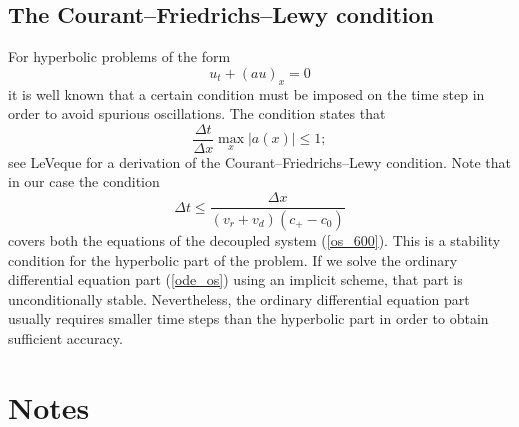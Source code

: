 \subsection{The Courant--Friedrichs--Lewy condition}
For hyperbolic problems of the form 
\begin{equation}
u_{t}+\left(  au\right)  _{x}=0
\end{equation}
it is well known that a certain condition must be imposed on the time step in order to avoid spurious oscillations. The condition states that 
\begin{equation}
\frac{\Delta t}{\Delta x} \max_x \vert a(x)\vert \le 1; \label{CFL}
\end{equation}
see LeVeque \cite{LeVeque2002} for a derivation of the Courant--Friedrichs--Lewy condition. Note that in our case the condition\begin{equation}
\Delta t\le \frac{\Delta x}{(v_r+v_d)(c_+ -c_0)} \label{CFL2}
\end{equation}
covers both the equations of the decoupled system (\ref{os_600}). This is a stability condition for the hyperbolic part of the problem. If we solve the ordinary differential equation part (\ref{ode_os}) using an implicit scheme, that part is unconditionally stable. Nevertheless, the ordinary differential equation part usually requires smaller time steps than the hyperbolic part in order to obtain sufficient accuracy. 




\section{Notes}
\label{notes_Ca_1D}

